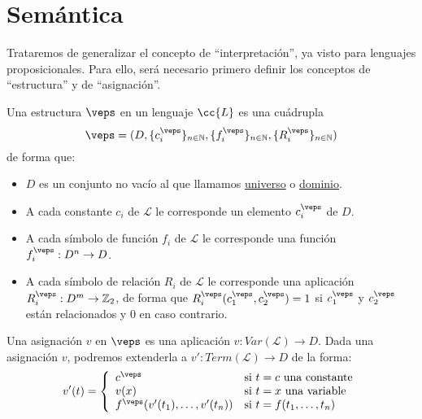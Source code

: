 \section{Semántica}
Trataremos de generalizar el concepto de ``interpretación'', ya visto para lenguajes proposicionales. Para ello, será necesario primero definir los conceptos de ``estructura'' y de ``asignación''.

\begin{definicion}[Estructura]
    Una estructura $\veps$ en un lenguaje $\cc{L}$ es una cuádrupla
    \begin{equation*}
        \veps = (D, \{c_i^\veps\}_{n\in \mathbb{N}}, \{f_i^\veps\}_{n\in \mathbb{N}}, \{R_i^\veps\}_{n\in \mathbb{N}})
    \end{equation*}
    de forma que:
    \begin{itemize}
        \item $D$ es un conjunto no vacío al que llamamos \underline{universo} o \underline{dominio}.
        \item A cada constante $c_i$ de $\mathcal{L}$ le corresponde un elemento $c_i^{\veps}$ de $D$.
        \item A cada símbolo de función $f_i$ de $\mathcal{L}$ le corresponde una función $f_i^\veps:D^n\to D$.
        \item A cada símbolo de relación $R_i$ de $\mathcal{L}$ le corresponde una aplicación ${R_i^\veps:D^m\to\mathbb{Z}_2}$, de forma que $R_i^\veps(c_1^\veps,c_2^\veps)=1$ si $c_1^\veps$ y $c_2^\veps$ están relacionados y 0 en caso contrario.
    \end{itemize}
\end{definicion}

\begin{definicion}[Asignación]
    Una asignación $v$ en $\veps$ es una aplicación ${v:Var(\mathcal{L})\to D}$. Dada una asignación $v$, podremos extenderla a $v':Term(\mathcal{L})\to D$ de la forma:
    \begin{equation*}
        v'(t) = \left\{\begin{array}{ll}
                c^\veps & \text{si\ } t=c \text{\ una constante} \\
                v(x) & \text{si\ } t=x \text{\ una variable} \\
                f^\veps(v'(t_1),\ldots,v'(t_n)) &\text{si\ } t=f(t_1,\ldots,t_n)
        \end{array}\right.
    \end{equation*}
\end{definicion}

